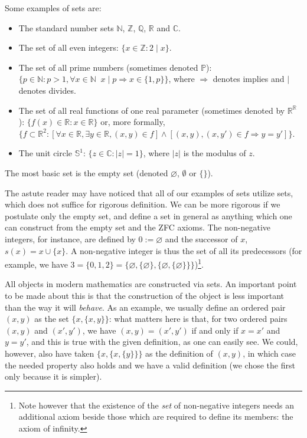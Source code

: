 \documentclass{article}
\newcommand{\bbC}{\mathbb{C}}
\newcommand{\bbN}{\mathbb{N}}
\newcommand{\bbP}{\mathbb{P}}
\newcommand{\bbQ}{\mathbb{Q}}
\newcommand{\bbR}{\mathbb{R}}
\newcommand{\bbS}{\mathbb{S}}
\newcommand{\bbZ}{\mathbb{Z}}
\renewcommand{\div}{\!\mid\!}
\begin{document}
Some examples of sets are:

\begin{itemize}
\item The standard number sets $\bbN$, $\bbZ$, $\bbQ$, $\bbR$ and $\bbC$.
\item The set of all even integers: $\{ x \in \mathbb{Z} : 2 \div x \}.$
\item The set of all prime numbers (sometimes denoted $\bbP$): $\{ p \in \mathbb{N} : p > 1, \forall x \in \mathbb{N} \;\; x \div p \Rightarrow x \in \{1 , p \} \}$, where $\Rightarrow$ denotes implies and $\mid$ denotes divides.
\item The set of all real functions of one real parameter (sometimes denoted by $\bbR^\bbR$): $\{ f(x) \in \mathbb{R} : x \in \mathbb{R} \}$ or, more formally, $\{f \subset \bbR^2 : \left[\forall x\in \bbR, \exists y\in \bbR, (x,y)\in f\right] \wedge \left[(x,y),(x,y')\in f \Rightarrow  y=y'\right] \}$.
\item The unit circle $\bbS^1$: $\{z\in \bbC : |z| = 1\}$, where $|z|$ is the modulus of $z$.
\end{itemize}

The most basic set is the empty set (denoted $\varnothing$, $\emptyset$ or $\{\}$).

The astute reader may have noticed that all of our examples of sets utilize sets, which does not suffice for rigorous definition. We can be more rigorous if we postulate only the empty set, and define a set in general as anything which one can construct from the empty set and the ZFC axioms. The non-negative integers, for instance, are defined by $0 := \varnothing$ and the successor of $x$, $s(x) = x \cup \{x\}.$ A non-negative integer is thus the set of all its predecessors (for example, we have $3 = \{0,1,2\} = \{\varnothing, \{\varnothing\},\{\varnothing, \{\varnothing\}\}\}$)\footnote{Note however that the existence of the \emph{set} of non-negative integers needs an additional axiom beside those which are required to define its members: the axiom of infinity.}.

All objects in modern mathematics are constructed via sets. An important point to be made about this is that the construction of the object is less important than the way it will \emph{behave}. As an example, we usually define an ordered pair $(x,y)$ as the set $\{x,\{x,y\}\}$: what matters here is that, for two ordered pairs $(x,y)$ and $(x',y')$, we have $(x,y) = (x',y')$ if and only if $x = x'$ and $y = y'$, and this is true with the given definition, as one can easily see. We could, however, also have taken $\{x,\{x,\{y\}\}\}$ as the definition of $(x,y)$, in which case the needed property also holds and we have a valid definition (we chose the first only because it is simpler).
\end{document}
